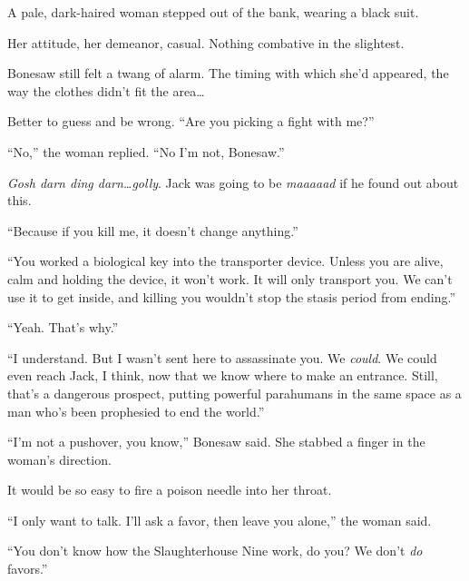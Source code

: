A pale, dark-haired woman stepped out of the bank, wearing a black suit.



Her attitude, her demeanor, casual.  Nothing combative in the slightest.



Bonesaw still felt a twang of alarm.  The timing with which she'd appeared, the way the clothes didn't fit the area\ldots



Better to guess and be wrong.  ``Are you picking a fight with me?''



``No,'' the woman replied.  ``No I'm not, Bonesaw.''



\emph{Gosh darn ding darn\ldots golly}.  Jack was going to be \emph{maaaaad }if he found out about this.



``Because if you kill me, it doesn't change anything.''



``You worked a biological key into the transporter device.  Unless you are alive, calm and holding the device, it won't work.  It will only transport you.  We can't use it to get inside, and killing you wouldn't stop the stasis period from ending.''



``Yeah.  That's why.''



``I understand.  But I wasn't sent here to assassinate you.  We \emph{could}.  We could even reach Jack, I think, now that we know where to make an entrance.  Still, that's a dangerous prospect, putting powerful parahumans in the same space as a man who's been prophesied to end the world.''



``I'm not a pushover, you know,'' Bonesaw said.  She stabbed a finger in the woman's direction.



It would be so easy to fire a poison needle into her throat.



``I only want to talk.  I'll ask a favor, then leave you alone,'' the woman said.



``You don't know how the Slaughterhouse Nine work, do you?  We don't \emph{do} favors.''



